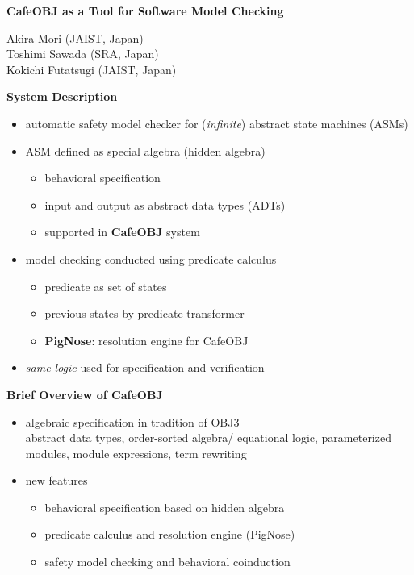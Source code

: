 \documentclass[landscape]{slides}
\begin{document}
\begin{slide}\Large
  \begin{center}
    \textbf{CafeOBJ as a Tool for Software Model Checking}

    \bigskip\bigskip\bigskip
    
    Akira Mori (JAIST, Japan)\\
    Toshimi Sawada (SRA, Japan)\\
    Kokichi Futatsugi (JAIST, Japan)
  \end{center}
\end{slide}

\begin{slide}\large\parskip=0pt
  \textbf{System Description}

  \begin{itemize}\itemsep=0pt
  \item automatic safety model checker for (\emph{infinite})
    abstract state machines (ASMs)
  \item ASM defined as special algebra (hidden algebra)
    \begin{itemize}
    \item behavioral specification
    \item input and output as abstract data types (ADTs)
    \item supported in \textbf{CafeOBJ} system
    \end{itemize}
  \item model checking conducted using predicate calculus
    \begin{itemize}
    \item predicate as set of states
    \item previous states by predicate transformer
    \item \textbf{PigNose}: resolution engine for CafeOBJ
    \end{itemize}
  \item \emph{same logic} used for specification and verification
  \end{itemize}
  
\end{slide}

\begin{slide}\large\parskip=0pt
  \textbf{Brief Overview of CafeOBJ}\bigskip

  \begin{itemize}\itemsep=0pt
  \item algebraic specification in tradition of \textsf{OBJ3}\\
    {\normalsize abstract data types, order-sorted algebra\slash
      equational logic, parameterized modules, module expressions,
      term rewriting}\bigskip
  \item new features
    \begin{itemize}
    \item behavioral specification based on hidden algebra
    \item predicate calculus and resolution engine (\textsf{PigNose})
    \item safety model checking and behavioral coinduction
    \end{itemize}
  \end{itemize}
\end{slide}
\end{document}

